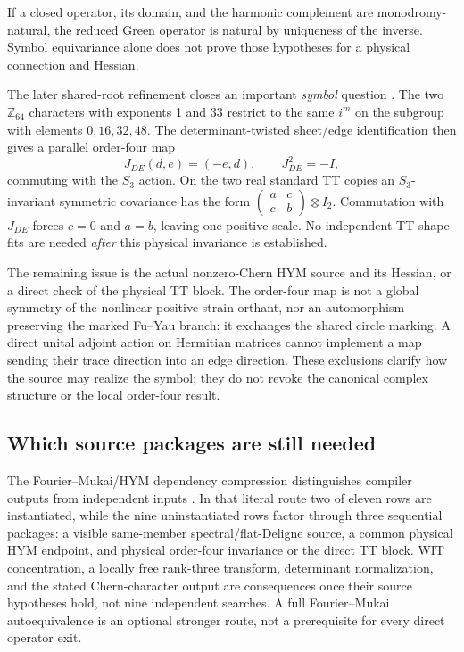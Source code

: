 \documentclass[11pt]{article}
\theoremstyle{definition}
\theoremstyle{remark}
\begin{document}
If a closed operator, its domain, and the harmonic complement are
monodromy-natural, the reduced Green operator is natural by uniqueness of
the inverse. Symbol equivariance alone does not prove those hypotheses
for a physical connection and Hessian.

\label{sec:shared-root-c4}
The later shared-root refinement closes an important \emph{symbol} question
\cite{FrozenC4}. The two \(\mathbb Z_{64}\) characters with exponents 1 and
33 restrict to the same \(i^m\) on the subgroup with elements
\(0,16,32,48\). The determinant-twisted sheet/edge identification then gives
a parallel order-four map
\[
J_{DE}(d,e)=(-e,d),\qquad J_{DE}^2=-I,
\]
commuting with the \(S_3\) action. On the two real standard TT copies an
\(S_3\)-invariant symmetric covariance has the form
\(\left(\begin{smallmatrix}a&c\\c&b\end{smallmatrix}\right)\otimes I_2\).
Commutation with \(J_{DE}\) forces \(c=0\) and \(a=b\), leaving one positive
scale. No independent TT shape fits are needed \emph{after} this physical
invariance is established.

The remaining issue is the actual nonzero-Chern HYM source and its Hessian,
or a direct check of the physical TT block. The order-four map is not a
global symmetry of the nonlinear positive strain orthant, nor an
automorphism preserving the marked Fu--Yau branch: it exchanges the shared
circle marking. A direct unital adjoint action on Hermitian matrices cannot
implement a map sending their trace direction into an edge direction.
These exclusions clarify how the source may realize the symbol; they do
not revoke the canonical complex structure or the local order-four result.

\subsection{Which source packages are still needed}
\label{sec:fm-hym}
The Fourier--Mukai/HYM dependency compression distinguishes compiler outputs
from independent inputs \cite{FrozenFM}. In that literal route two of eleven
rows are instantiated, while the nine uninstantiated rows factor through
three sequential packages: a visible same-member spectral/flat-Deligne
source, a common physical HYM endpoint, and physical order-four invariance
or the direct TT block. WIT concentration, a locally free rank-three
transform, determinant normalization, and the stated Chern-character output
are consequences once their source hypotheses hold, not nine independent
searches. A full Fourier--Mukai autoequivalence is an optional stronger route,
not a prerequisite for every direct operator exit.
\end{document}
